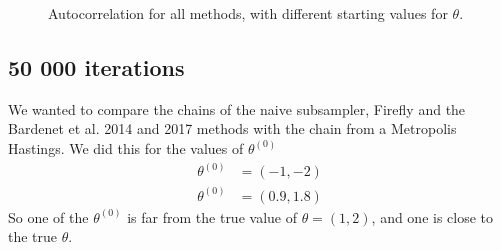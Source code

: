 \begin{figure}
    \caption{Autocorrelation for all methods, with different starting values for $\theta$. }%
    \label{fig:autocorrelation_10k_02_06}%
\end{figure}



\subsection{50 000 iterations}
We wanted to compare the chains of the naive subsampler, Firefly and the Bardenet et al. 2014 and 2017 methods with the chain from a Metropolis Hastings. We did this for the values of $\theta^{\left(0\right)}$
\begin{equation*}
\begin{split}
     \theta^{\left(0\right)} &= \left(-1, -2\right) \\
     \theta^{\left(0\right)} & = \left(0.9, 1.8\right)
\end{split}
\end{equation*}
So one of the $\theta^{\left(0\right)}$ is far from the true value of $\theta = \left(1,2\right)$, and one is close to the true $\theta$.   


